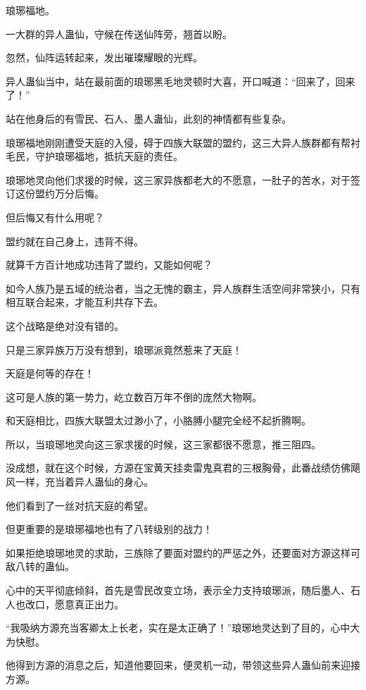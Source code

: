 
\begin{this_body}

琅琊福地。

一大群的异人蛊仙，守候在传送仙阵旁，翘首以盼。

忽然，仙阵运转起来，发出璀璨耀眼的光辉。

异人蛊仙当中，站在最前面的琅琊黑毛地灵顿时大喜，开口喊道：“回来了，回来了！”

站在他身后的有雪民、石人、墨人蛊仙，此刻的神情都有些复杂。

琅琊福地刚刚遭受天庭的入侵，碍于四族大联盟的盟约，这三大异人族群都有帮衬毛民，守护琅琊福地，抵抗天庭的责任。

琅琊地灵向他们求援的时候，这三家异族都老大的不愿意，一肚子的苦水，对于签订这份盟约万分后悔。

但后悔又有什么用呢？

盟约就在自己身上，违背不得。

就算千方百计地成功违背了盟约，又能如何呢？

如今人族乃是五域的统治者，当之无愧的霸主，异人族群生活空间非常狭小，只有相互联合起来，才能互利共存下去。

这个战略是绝对没有错的。

只是三家异族万万没有想到，琅琊派竟然惹来了天庭！

天庭是何等的存在！

这可是人族的第一势力，屹立数百万年不倒的庞然大物啊。

和天庭相比，四族大联盟太过渺小了，小胳膊小腿完全经不起折腾啊。

所以，当琅琊地灵向这三家求援的时候，这三家都很不愿意，推三阻四。

没成想，就在这个时候，方源在宝黄天挂卖雷鬼真君的三根胸骨，此番战绩仿佛飓风一样，充当着异人蛊仙的身心。

他们看到了一丝对抗天庭的希望。

但更重要的是琅琊福地也有了八转级别的战力！

如果拒绝琅琊地灵的求助，三族除了要面对盟约的严惩之外，还要面对方源这样可敌八转的蛊仙。

心中的天平彻底倾斜，首先是雪民改变立场，表示全力支持琅琊派，随后墨人、石人也改口，愿意真正出力。

“我吸纳方源充当客卿太上长老，实在是太正确了！”琅琊地灵达到了目的，心中大为快慰。

他得到方源的消息之后，知道他要回来，便灵机一动，带领这些异人蛊仙前来迎接方源。


\end{this_body}

